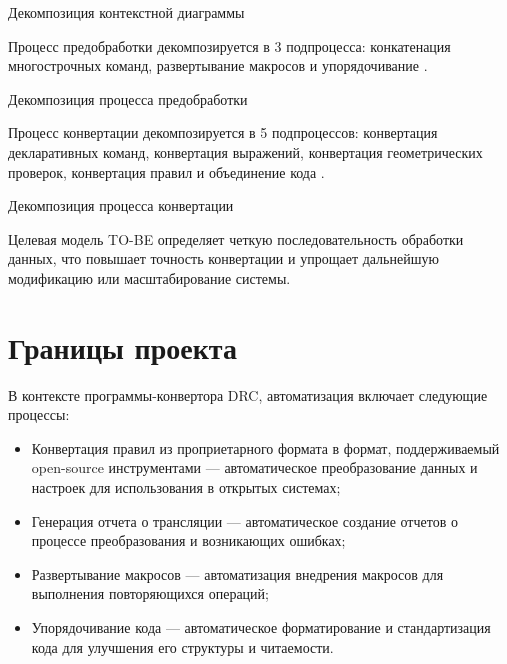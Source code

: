 \begin{image}
	\caption{Декомпозиция контекстной диаграммы}
	\label{fig:idef0:a0}
\end{image}

Процесс предобработки декомпозируется в 3 подпроцесса:
конкатенация многострочных команд, развертывание макросов
и упорядочивание .

\begin{image}
	\caption{Декомпозиция процесса предобработки}
	\label{fig:idef0:a3}
\end{image}

Процесс конвертации декомпозируется в 5 подпроцессов:
конвертация декларативных команд, конвертация выражений,
конвертация геометрических проверок, конвертация правил
и объединение кода .

\begin{image}
	\caption{Декомпозиция процесса конвертации}
	\label{fig:idef0:a4}
\end{image}

Целевая модель TO-BE определяет четкую последовательность обработки данных,
что повышает точность конвертации
и упрощает дальнейшую модификацию или масштабирование системы.

\section{Границы проекта}

В контексте программы-конвертора DRC,
автоматизация включает следующие процессы:

\begin{itemize}
	\item Конвертация правил из проприетарного формата в формат,
		поддерживаемый open-source инструментами
		--- автоматическое преобразование данных
		и настроек для использования в открытых системах;
	\item Генерация отчета о трансляции --- автоматическое создание отчетов
		о процессе преобразования и возникающих ошибках;
	\item Развертывание макросов --- автоматизация внедрения макросов
		для выполнения повторяющихся операций;
	\item Упорядочивание кода --- автоматическое форматирование
		и стандартизация кода для улучшения его структуры и читаемости.
\end{itemize}

